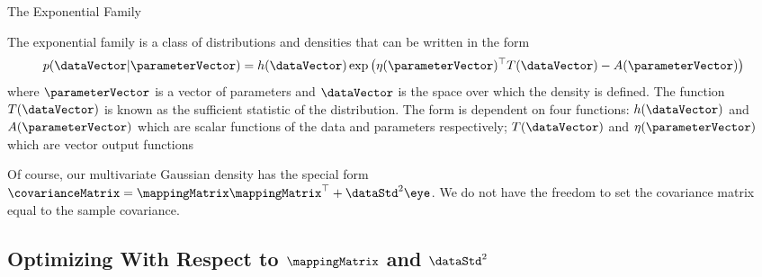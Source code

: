 \begin{boxfloat}
  \caption{The Exponential Family}\label{box:exponentialFamily}

  \boxfontsize The exponential family is a class of distributions and
  densities that can be written in the form
  \[
  p(\dataVector | \parameterVector) = h(\dataVector) \exp \left(\eta(\parameterVector)^\top T(\dataVector) - A(\parameterVector)\right)
  \]
  where $\parameterVector$ is a vector of parameters and $\dataVector$
  is the space over which the density is defined. The function
  $T(\dataVector)$ is known as the sufficient statistic of the
  distribution. The form is dependent on four functions:
  $h(\dataVector)$ and $A(\parameterVector)$ which are scalar
  functions of the data and parameters respectively; $T(\dataVector)$
  and $\eta(\parameterVector)$ which are vector output functions


  

\end{boxfloat}

Of course, our multivariate Gaussian density has the special form
$\covarianceMatrix = \mappingMatrix \mappingMatrix^\top + \dataStd^2
\eye$. We do not have the freedom to set the covariance matrix equal
to the sample covariance.

\subsection{Optimizing With Respect to $\mappingMatrix$ and $\dataStd^2$}

